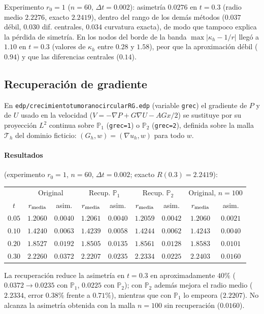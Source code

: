 Experimento $r_0=1$ ($n=60$, $\Delta t=0.002$): asimetría $0.0276$ en $t=0.3$ (radio medio $2.2276$, exacto $2.2419$), dentro del rango de los demás métodos ($0.037$ débil, $0.030$ dif. centrales, $0.034$ curvatura exacta), de modo que tampoco explica la pérdida de simetría. En los nodos del borde de la banda $\max|\kappa_h-1/r|$ llegó a $1.10$ en $t=0.3$ (valores de $\kappa_h$ entre $0.28$ y $1.58$), peor que la aproximación débil ($0.94$) y que las diferencias centrales ($0.14$).

\subsection{Recuperación de gradiente}

En \texttt{edp/crecimientotumoranocircularRG.edp} (variable \texttt{grec}) el gradiente de $P$ y de $U$ usado en la velocidad ($V=-\nabla P+G\nabla U-AGx/2$) se sustituye por su proyección $L^2$ continua sobre $\mathbb{P}_1$ (\texttt{grec=1}) o $\mathbb{P}_2$ (\texttt{grec=2}), definida sobre la malla $\mathcal{T}_h$ del dominio ficticio: $(G_h,w)=(\nabla u_h,w)$ para todo $w$.

\paragraph{Resultados} (experimento $r_0=1$, $n=60$, $\Delta t=0.002$; exacto $R(0.3)=2.2419$):
\begin{center}
\begin{tabular}{c|cc|cc|cc|cc}
\toprule
 & \multicolumn{2}{c|}{Original} & \multicolumn{2}{c|}{Recup. $\mathbb{P}_1$} & \multicolumn{2}{c|}{Recup. $\mathbb{P}_2$} & \multicolumn{2}{c}{Original, $n=100$}\\
$t$ & $r_{\rm media}$ & asim. & $r_{\rm media}$ & asim. & $r_{\rm media}$ & asim. & $r_{\rm media}$ & asim.\\
\midrule
$0.05$ & $1.2060$ & $0.0040$ & $1.2061$ & $0.0040$ & $1.2059$ & $0.0042$ & $1.2060$ & $0.0021$\\
$0.10$ & $1.4240$ & $0.0063$ & $1.4239$ & $0.0058$ & $1.4244$ & $0.0062$ & $1.4243$ & $0.0040$\\
$0.20$ & $1.8527$ & $0.0192$ & $1.8505$ & $0.0135$ & $1.8561$ & $0.0128$ & $1.8583$ & $0.0101$\\
$0.30$ & $2.2260$ & $0.0372$ & $2.2207$ & $0.0235$ & $2.2334$ & $0.0225$ & $2.2403$ & $0.0160$\\
\bottomrule
\end{tabular}
\end{center}
La recuperación reduce la asimetría en $t=0.3$ en aproximadamente $40\%$ ($0.0372\to0.0235$ con $\mathbb{P}_1$, $0.0225$ con $\mathbb{P}_2$); con $\mathbb{P}_2$ además mejora el radio medio ($2.2334$, error $0.38\%$ frente a $0.71\%$), mientras que con $\mathbb{P}_1$ lo empeora ($2.2207$). No alcanza la asimetría obtenida con la malla $n=100$ sin recuperación ($0.0160$).

